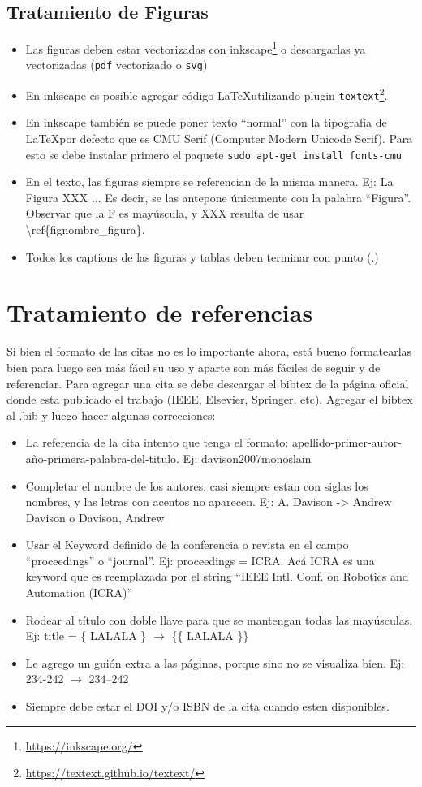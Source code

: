 \documentclass[a4paper,	11pt]{article}
\begin{document}
\subsection{Tratamiento de Figuras}
%
\begin{itemize}
    \item Las figuras deben estar vectorizadas con inkscape\footnote{\url{https://inkscape.org/}} o descargarlas ya vectorizadas (\lstinline{pdf} vectorizado o \lstinline{svg})
    \item En inkscape es posible agregar código \LaTeX utilizando plugin \lstinline{textext}\footnote{\url{https://textext.github.io/textext/}}.
    \item En inkscape también se puede poner texto ``normal'' con la tipografía de \LaTeX por defecto que es CMU Serif  (Computer Modern Unicode Serif). Para esto se debe instalar primero el paquete \lstinline{sudo apt-get install fonts-cmu}
    \item En el texto, las figuras siempre se referencian de la misma manera. Ej: La Figura XXX ... Es decir, se las antepone únicamente con la palabra ``Figura''. Observar que la F es mayúscula, y XXX resulta de usar \textbackslash ref\{fig\:nombre\_figura\}.
    \item Todos los captions de las figuras y tablas deben terminar con punto (.)
\end{itemize}


\section{Tratamiento de referencias}
Si bien el formato de las citas no es lo importante ahora, está bueno formatearlas bien para luego sea más fácil su uso y aparte son más fáciles de seguir y de referenciar. Para agregar una cita se debe descargar el bibtex de la página oficial donde esta publicado el trabajo (IEEE, Elsevier, Springer, etc). Agregar el bibtex al .bib y luego hacer algunas correcciones:
\begin{itemize}
    \item La referencia de la cita intento que tenga el formato: apellido-primer-autor-año-primera-palabra-del-titulo. Ej: davison2007monoslam
    \item Completar el nombre de los autores, casi siempre estan con siglas los nombres, y las letras con acentos no aparecen. Ej: A. Davison -> Andrew Davison o Davison, Andrew
    \item Usar el Keyword definido de la conferencia o revista en el campo ``proceedings'' o ``journal''. Ej: proceedings = ICRA. Acá ICRA es una keyword que es reemplazada por el string ``IEEE Intl. Conf. on Robotics and Automation (ICRA)''
    \item Rodear al título con doble llave para que se mantengan todas las mayúsculas. Ej: title = \{ LALALA \} $\rightarrow$ \{\{ LALALA \}\}
    \item Le agrego un guión extra a las páginas, porque sino no se visualiza bien. Ej: 234-242 $\rightarrow$ 234--242
    \item Siempre debe estar el DOI y/o ISBN de la cita cuando esten disponibles.
\end{itemize}
\end{document}
